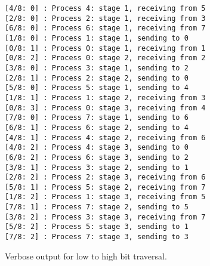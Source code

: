 \documentclass[11pt,a4paper,oneside]{report}
\begin{document}
\begin{figure}[htpb]
  \texttt{[4/8:   0] : Process 4:  stage 1, receiving from 5\\}
  \texttt{[2/8:   0] : Process 2:  stage 1, receiving from 3\\}
  \texttt{[6/8:   0] : Process 6:  stage 1, receiving from 7\\}
  \texttt{[1/8:   0] : Process 1:  stage 1, sending to 0\\}
  \texttt{[0/8:   1] : Process 0:  stage 1, receiving from 1\\}
  \texttt{[0/8:   2] : Process 0:  stage 2, receiving from 2\\}
  \texttt{[3/8:   0] : Process 3:  stage 1, sending to 2\\}
  \texttt{[2/8:   1] : Process 2:  stage 2, sending to 0\\}
  \texttt{[5/8:   0] : Process 5:  stage 1, sending to 4\\}
  \texttt{[1/8:   1] : Process 1:  stage 2, receiving from 3\\}
  \texttt{[0/8:   3] : Process 0:  stage 3, receiving from 4\\}
  \texttt{[7/8:   0] : Process 7:  stage 1, sending to 6\\}
  \texttt{[6/8:   1] : Process 6:  stage 2, sending to 4\\}
  \texttt{[4/8:   1] : Process 4:  stage 2, receiving from 6\\}
  \texttt{[4/8:   2] : Process 4:  stage 3, sending to 0\\}
  \texttt{[6/8:   2] : Process 6:  stage 3, sending to 2\\}
  \texttt{[3/8:   1] : Process 3:  stage 2, sending to 1\\}
  \texttt{[2/8:   2] : Process 2:  stage 3, receiving from 6\\}
  \texttt{[5/8:   1] : Process 5:  stage 2, receiving from 7\\}
  \texttt{[1/8:   2] : Process 1:  stage 3, receiving from 5\\}
  \texttt{[7/8:   1] : Process 7:  stage 2, sending to 5\\}
  \texttt{[3/8:   2] : Process 3:  stage 3, receiving from 7\\}
  \texttt{[5/8:   2] : Process 5:  stage 3, sending to 1\\}
  \texttt{[7/8:   2] : Process 7:  stage 3, sending to 3\\}
  \caption{Verbose output for low to high bit traversal.}
  \label{fig:lowtohighout}
\end{figure}
\end{document}
